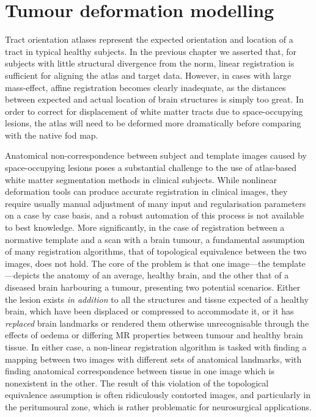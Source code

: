 \section{Tumour deformation modelling}
\label{chapterlabel3}

Tract orientation atlases represent the expected orientation and location of a tract in typical healthy subjects.
In the previous chapter we asserted that, for subjects with little structural divergence from the norm, linear registration is sufficient for aligning the atlas and target data.
However, in cases with large mass-effect, affine registration becomes clearly inadequate, as the distances between expected and actual location of brain structures is simply too great.
In order to correct for displacement of white matter tracts due to space-occupying lesions, the atlas will need to be deformed more dramatically before comparing with the native \gls{fod} map.

Anatomical non-correspondence between subject and template images caused by space-occupying lesions poses a substantial challenge to the use of atlas-based white matter segmentation methods in clinical subjects.
While nonlinear deformation tools can produce accurate registration in clinical images, they require usually manual adjustment of many input and regularisation parameters on a case by case basis, and a robust automation of this process is not available to best knowledge.
More significantly, in the case of registration between a normative template and a scan with a brain tumour, a fundamental assumption of many registration algorithms, that of topological equivalence between the two images, does not hold.\autocite{Zacharaki2009}
The core of the problem is that one image---the template---depicts the anatomy of an average, healthy brain, and the other that of a diseased brain harbouring a tumour, presenting two potential scenarios.
Either the lesion exists \textit{in addition} to all the structures and tissue expected of a healthy brain, which have been displaced or compressed to accommodate it, or it has \textit{replaced} brain landmarks or rendered them otherwise unrecognisable through the effects of oedema or differing MR properties between tumour and healthy brain tissue.
In either case, a non-linear registration algorithm is tasked with finding a mapping between two images with different sets of anatomical landmarks, with finding anatomical correspondence between tissue in one image which is nonexistent in the other.
The result of this violation of the topological equivalence assumption is often ridiculously contorted images, and particularly in the peritumoural zone, which is rather problematic for neurosurgical applications.

